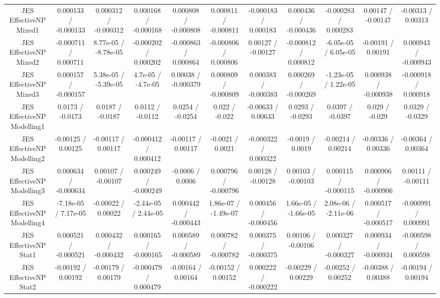 \begin{table}[htbp]
\begin{center}
\begin{tabular}{|c|c|c|c|c|c|c|c|c|c|c|}
  JES EffectiveNP Mixed1 & 0.000133 / -0.000133 & 0.000312 / -0.000312 & 0.000168 / -0.000168 & 0.000808 / -0.000808 & 0.000811 / -0.000811 & -0.000183 / 0.000183 & 0.000436 / -0.000436 & -0.000283 / 0.000283 & 0.00147 / -0.00147 & -0.00313 / 0.00313 \\ 
  JES EffectiveNP Mixed2 & -0.000711 / 0.000711 & 8.77e-05 / -8.78e-05 & -0.000202 / 0.000202 & -0.000863 / 0.000864 & -0.000806 / 0.000806 & 0.00127 / -0.00127 & -0.000812 / 0.000812 & -6.05e-05 / 6.05e-05 & -0.00191 / 0.00191 & 0.000943 / -0.000943 \\ 
  JES EffectiveNP Mixed3 & 0.000157 / -0.000157 & 5.38e-05 / -5.39e-05 & 4.7e-05 / -4.7e-05 & 0.00038 / -0.000379 & 0.000809 / -0.000809 & 0.000383 / -0.000383 & 0.000269 / -0.000269 & -1.23e-05 / 1.22e-05 & 0.000938 / -0.000938 & -0.000918 / 0.000918 \\ 
  JES EffectiveNP Modelling1 & 0.0173 / -0.0173 & 0.0187 / -0.0187 & 0.0112 / -0.0112 & 0.0254 / -0.0254 & 0.022 / -0.022 & -0.00633 / 0.00633 & 0.0293 / -0.0293 & 0.0397 / -0.0397 & 0.029 / -0.029 & 0.0329 / -0.0329 \\ 
  JES EffectiveNP Modelling2 & -0.00125 / 0.00125 & -0.00117 / 0.00117 & -0.000412 / 0.000412 & -0.00117 / 0.00117 & -0.0021 / 0.0021 & -0.000322 / 0.000322 & -0.0019 / 0.0019 & -0.00214 / 0.00214 & -0.00336 / 0.00336 & -0.00364 / 0.00364 \\ 
  JES EffectiveNP Modelling3 & 0.000634 / -0.000634 & 0.00107 / -0.00107 & 0.000249 / -0.000249 & -0.0006 / 0.0006 & 0.000796 / -0.000796 & 0.00128 / -0.00128 & 0.00103 / -0.00103 & 0.000115 / -0.000115 & 0.000906 / -0.000906 & 0.00111 / -0.00111 \\ 
  JES EffectiveNP Modelling4 & -7.18e-05 / 7.17e-05 & -0.00022 / 0.00022 & -2.44e-05 / 2.44e-05 & 0.000442 / -0.000443 & 1.86e-07 / -1.49e-07 & 0.000456 / -0.000456 & 1.66e-05 / -1.66e-05 & 2.08e-06 / -2.11e-06 & 0.000517 / -0.000517 & -0.000991 / 0.000991 \\ 
  JES EffectiveNP Stat1 & 0.000521 / -0.000521 & 0.000432 / -0.000432 & 0.000165 / -0.000165 & 0.000589 / -0.000589 & 0.000782 / -0.000782 & 0.000375 / -0.000375 & 0.00106 / -0.00106 & 0.000327 / -0.000327 & 0.000934 / -0.000934 & -0.000598 / 0.000598 \\ 
  JES EffectiveNP Stat2 & -0.00192 / 0.00192 & -0.00179 / 0.00179 & -0.000479 / 0.000479 & -0.00164 / 0.00164 & -0.00152 / 0.00152 & 0.000222 / -0.000222 & -0.00229 / 0.00229 & -0.00252 / 0.00252 & -0.00388 / 0.00388 & -0.00194 / 0.00194 \\ 

\end{tabular}
\end{center}
\end{table}
